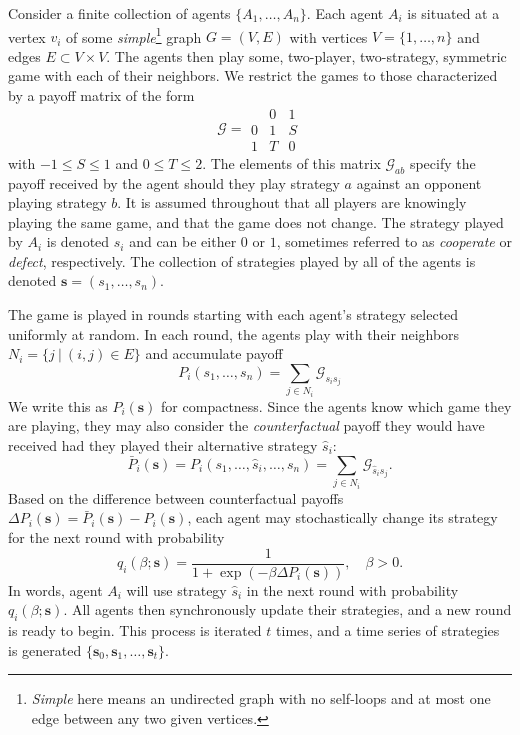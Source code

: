 \documentclass[letterpaper]{article}
\begin{document}
Consider a finite collection of agents $\{A_1, \ldots, A_n\}$. Each agent $A_i$ is situated at a vertex $v_i$ of some \textit{simple}\footnote{\textit{Simple} here means an undirected graph with no self-loops and at most one edge between any two given vertices.} graph $G=(V,E)$ with vertices $V=\{1,\dots,n\}$ and edges ${E \subset V \times V}$. The agents then play some, two-player, two-strategy, symmetric game with each of their neighbors. We restrict the games to those characterized by a payoff matrix of the form
\begin{equation}
    \label{eq:game}
    \mathcal{G} = \begin{array}{c|cc}
      & 0 & 1 \\\hline
    0 & 1 & S \\
    1 & T & 0
    \end{array}
\end{equation}
with $-1 \leq S \leq 1$ and $0 \leq T \leq 2$. The elements of this matrix $\mathcal{G}_{ab}$ specify the payoff received by the agent should they play strategy $a$ against an opponent playing strategy $b$. It is assumed throughout that all players are knowingly playing the same game, and that the game does not change. The strategy played by $A_i$ is denoted $s_i$ and can be either $0$ or $1$, sometimes referred to as \textit{cooperate} or \textit{defect}, respectively. The collection of strategies played by all of the agents is denoted $\bm{s} = (s_1,\ldots,s_n)$.

The game is played in rounds starting with each agent's strategy selected uniformly at random. In each round, the agents play with their neighbors $N_i = \{j~|~(i,j) \in E\}$ and accumulate payoff
\begin{equation}
    P_i(s_1, \ldots, s_n) = \sum_{j \in N_i} \mathcal{G}_{{s_i}{s_j}}
\end{equation}
We write this as $P_i(\bm{s})$ for compactness. Since the agents know which game they are playing, they may also consider the \textit{counterfactual} payoff they would have received had they played their alternative strategy $\hat{s}_i$:
\begin{equation}
    \bar{P}_i(\bm{s}) = P_i(s_1, \ldots, \hat{s}_i, \ldots, s_n) = \sum_{j \in N_i} \mathcal{G}_{{\hat{s}_i}{s_j}}.
\end{equation}
Based on the difference between counterfactual payoffs ${\Delta P_i(\bm{s})=\bar{P}_i(\bm{s})-P_i(\bm{s})}$, each agent may stochastically change its strategy for the next round with probability
\begin{equation}
    \label{eq:sigmoid}
    q_i(\beta; \bm{s}) = \frac{1}{1 + \exp{\left(-\beta \Delta P_i(\bm{s})\right)}},\quad \beta > 0.
\end{equation}
In words, agent $A_i$ will use strategy $\hat{s}_i$ in the next round with probability $q_i(\beta; \bm{s})$. All agents then synchronously update their strategies, and a new round is ready to begin. This process is iterated $t$ times, and a time series of strategies is generated $\{\bm{s}_0, \bm{s}_1, \ldots, \bm{s}_t\}$.
\end{document}
